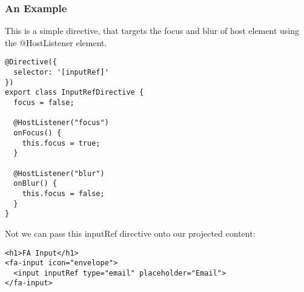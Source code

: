 \subsubsection{ An Example }
This is a simple directive, that targets the focus and blur of host element
using the @HostListener element.

\begin{lstlisting}
@Directive({
  selector: '[inputRef]'
})
export class InputRefDirective {
  focus = false;

  @HostListener("focus")
  onFocus() {
    this.focus = true;
  }

  @HostListener("blur")
  onBlur() {
    this.focus = false;
  }
}
\end{lstlisting}

Not we can pass this inputRef directive onto our projected content:
\begin{lstlisting}
<h1>FA Input</h1>
<fa-input icon="envelope">
  <input inputRef type="email" placeholder="Email">
</fa-input>
\end{lstlisting}
